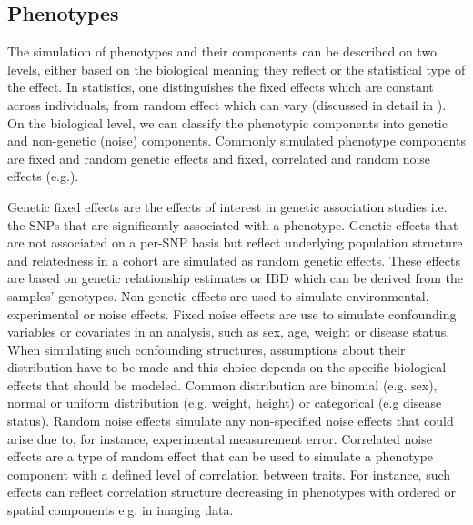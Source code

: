 \subsection{Phenotypes}
\label{subsection:phenotypes}
The simulation of phenotypes and their components can be described on two levels, either based on the biological meaning they reflect or the statistical type of the effect. In statistics, one distinguishes the fixed effects which are constant across individuals, from random effect which can vary (discussed in detail in \citep{Gelman2005}). On the biological level, we can classify the phenotypic components into genetic and non-genetic (noise) components.
Commonly simulated phenotype components are fixed and random genetic effects and fixed, correlated and random noise effects (e.g.\citep{Stephens2013,Marigorta2014,Zhou2014,Loh2014}). 

Genetic fixed effects are the effects of interest in genetic association studies i.e. the SNPs that are significantly associated with a phenotype. Genetic effects that are not associated on a per-SNP basis but reflect underlying population structure and relatedness in a cohort are simulated as random genetic effects. These effects are based on genetic relationship estimates or IBD which can be derived from the samples' genotypes. Non-genetic effects are used to simulate environmental, experimental or noise effects. Fixed noise effects are use to simulate confounding variables or covariates in an analysis, such as sex, age, weight or disease status. When simulating such confounding structures, assumptions about their distribution have to be made and this choice depends on the specific biological effects that should be modeled. Common distribution are binomial (e.g. sex), normal or uniform distribution (e.g. weight, height) or categorical (e.g disease status). Random noise effects simulate any non-specified noise effects that could arise due to, for instance, experimental measurement error.  Correlated noise effects are a type of random effect that can be used to simulate a phenotype component with a defined level of correlation between traits. For instance, such effects can reflect correlation structure decreasing in phenotypes with ordered or spatial components e.g. in imaging data. 

